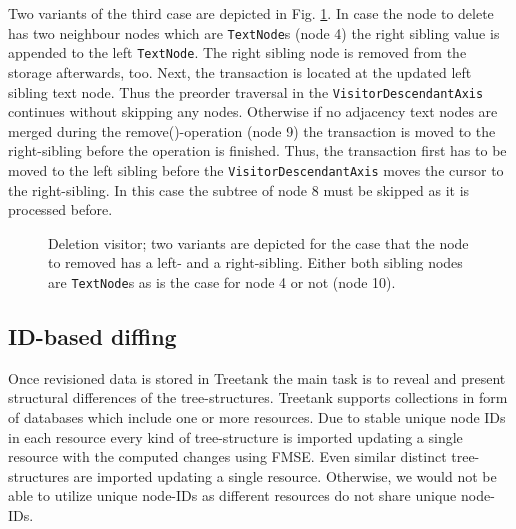 Two variants of the third case are depicted in Fig. \ref{fig:deletionvisitor}. In case the node to delete has two neighbour nodes which are \texttt{TextNode}s (node 4) the right sibling value is appended to the left \texttt{TextNode}. The right sibling node is removed from the storage afterwards, too. Next, the transaction is located at the updated left sibling text node. Thus the preorder traversal in the \texttt{VisitorDescendantAxis} continues without skipping any nodes. Otherwise if no adjacency text nodes are merged during the remove()-operation (node 9) the transaction is moved to the right-sibling before the operation is finished. Thus, the transaction first has to be moved to the left sibling before the \texttt{VisitorDescendantAxis} moves the cursor to the right-sibling. In this case the subtree of node 8 must be skipped as it is processed before.

\begin{figure}[tb]
\caption{\label{fig:deletionvisitor} Deletion visitor; two variants are depicted for the case that the node to removed has a left- and a right-sibling. Either both sibling nodes are \texttt{TextNode}s as is the case for node 4 or not (node 10).}
\end{figure} 

\subsection{ID-based diffing}
Once revisioned data is stored in Treetank the main task is to reveal and present structural differences of the tree-structures. Treetank supports collections in form of databases which include one or more resources. Due to stable unique node IDs in each resource every kind of tree-structure is imported updating a single resource with the computed changes using FMSE. Even similar distinct tree-structures are imported updating a single resource. Otherwise, we would not be able to utilize unique node-IDs as different resources do not share unique node-IDs.

